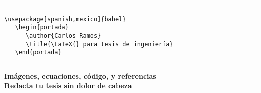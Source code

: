 \begin{titlepage} %
\pagecolor{FondoPortada}
\color{TextoPortada}
\vspace*{2.5cm}
\noindent\scalebox{9}{\textbf{\LaTeX{}}} %
\newline\vspace{0.5cm}
\noindent\scalebox{4.5}{para tesis de ingeniería}
\vspace{2.5cm}
\begin{adjustwidth}{-\margenIzquierdo}{-\margenDerecho}
\begin{mdframed}[
	backgroundcolor=FondoCodigoPortada,
	innertopmargin=0pt,
	innerbottommargin=0pt,
	innerrightmargin=0pt,
	innerleftmargin=0pt
]
\begin{lstlisting}[style=portada]
   \usepackage[spanish,mexico]{babel}
   \begin{portada}
      \author{Carlos Ramos}
      \title{\LaTeX{} para tesis de ingeniería}
   \end{portada}
\end{lstlisting}
\end{mdframed}
\end{adjustwidth}
\vspace{2.5cm}
\noindent\rule{0.25\linewidth}{2pt}
\vspace{1.25cm}
\noindent\textbf{\Large
	Imágenes, ecuaciones, código, y referencias
	\\[4pt] %
	Redacta tu tesis sin dolor de cabeza
}
\end{titlepage}
\pagecolor{White} %